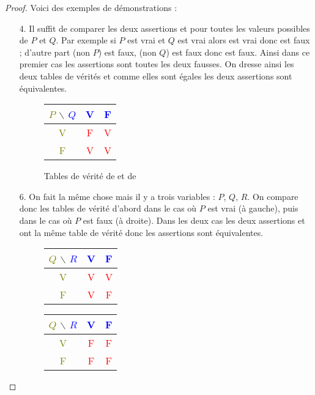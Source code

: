 \documentclass[11pt,class=report,crop=false]{standalone}
\begin{document}
\begin{proof}
Voici des exemples de démonstrations :


\begin{itemize}
  \item[4.]
Il suffit de comparer les deux assertions    et
  pour toutes les valeurs possibles de $P$ et $Q$.
Par exemple si $P$ est vrai et $Q$ est vrai alors   est vrai donc
   est faux ;
d'autre part (non $P$) est faux,  (non $Q$) est faux donc
   est faux.
Ainsi dans ce premier cas les assertions sont toutes les deux fausses.
On dresse ainsi les deux tables de vérités et comme elles sont égales les deux assertions sont équivalentes.
\begin{figure}[H]
\centering
\begin{tabular}{c|c|c}
\textcolor{olive}{$P$} $\backslash$ \textcolor{blue}{$Q$}  & \textcolor{blue}{V} & \textcolor{blue}{F} \\ \hline
\textcolor{olive}{V} & \textcolor{red}{F} & \textcolor{red}{V} \\ \hline
\textcolor{olive}{F} & \textcolor{red}{V} & \textcolor{red}{V} \\
\end{tabular}
\caption{Tables de vérité de   et de }
\end{figure}

  \item[6.] On fait la même chose mais il y a trois variables : $P$, $Q$, $R$.
On compare donc les tables de vérité d'abord dans le cas où $P$ est vrai (à gauche), puis dans le cas où
$P$ est faux (à droite). Dans les deux cas les deux assertions    et
  ont la même table de vérité donc les assertions sont équivalentes.
\begin{figure}[H]
\centering
\begin{tabular}{c|c|c}
\textcolor{olive}{$Q$} $\backslash$ \textcolor{blue}{$R$}  & \textcolor{blue}{V} & \textcolor{blue}{F} \\ \hline
\textcolor{olive}{V} & \textcolor{red}{V} & \textcolor{red}{V} \\ \hline
\textcolor{olive}{F} & \textcolor{red}{V} & \textcolor{red}{F} \\
\end{tabular}\qquad
\begin{tabular}{c|c|c}
\textcolor{olive}{$Q$} $\backslash$ \textcolor{blue}{$R$}  & \textcolor{blue}{V} & \textcolor{blue}{F} \\ \hline
\textcolor{olive}{V} & \textcolor{red}{F} & \textcolor{red}{F} \\ \hline
\textcolor{olive}{F} & \textcolor{red}{F} & \textcolor{red}{F} \\
\end{tabular}
\end{figure}


\end{itemize}
\end{proof}
\end{document}
